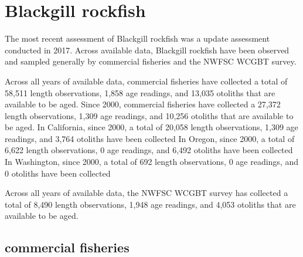 \documentclass[11pt,
  english,
  letterpaper,
]{article}
\begin{document}

\hypertarget{blackgill-rockfish}{%
\section{Blackgill rockfish}\label{blackgill-rockfish}}

\leavevmode\tagmcend\tagstructend


The most recent assessment of Blackgill rockfish was a update assessment conducted in 2017. Across available data, Blackgill rockfish have been observed and sampled generally by commercial fisheries and the NWFSC WCGBT survey.

\leavevmode\tagmcend\tagstructend\par


Across all years of available data, commercial fisheries have collected a total of 58,511 length observations, 1,858 age readings, and 13,035 otoliths that are available to be aged. Since 2000, commercial fisheries have collected a 27,372 length observations, 1,309 age readings, and 10,256 otoliths that are available to be aged. In California, since 2000, a total of 20,058 length observations, 1,309 age readings, and 3,764 otoliths have been collected In Oregon, since 2000, a total of 6,622 length observations, 0 age readings, and 6,492 otoliths have been collected In Washington, since 2000, a total of 692 length observations, 0 age readings, and 0 otoliths have been collected

\leavevmode\tagmcend\tagstructend\par


Across all years of available data, the NWFSC WCGBT survey has collected a total of 8,490 length observations, 1,948 age readings, and 4,053 otoliths that are available to be aged.

\leavevmode\tagmcend\tagstructend\par


\hypertarget{commercial-fisheries-5}{%
\subsection{commercial fisheries}\label{commercial-fisheries-5}}
\end{document}
